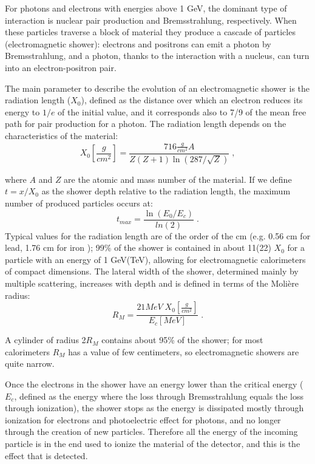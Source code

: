 For photons and electrons with energies above 1 GeV, the dominant type of interaction is nuclear pair production and Bremsstrahlung, respectively. 
When these particles traverse a block of material they produce a cascade of particles (electromagnetic shower): electrons and positrons can emit a photon by Bremsstrahlung, and a photon, thanks to the interaction with a nucleus, can turn into an electron-positron pair.

The main parameter to describe the evolution of an electromagnetic shower is the radiation length ($X_0$), defined as the distance over which an electron reduces its energy to $1/e$ of the initial value, and it corresponds also to 7/9 of the mean free path for pair production for a photon. The radiation length depends on the characteristics of the material:
\begin{equation}
X_0 [\frac{g}{cm^2}] = \frac{716 \frac{g}{ cm^2} A }{Z(Z+1) \ln\left(287/\sqrt{Z}\right)} \; , \nonumber
\end{equation}

\noindent where $A$ and $Z$ are the atomic and mass number of the material. If we define $t = x/X_0$ as the shower depth relative to the radiation length, the maximum number of produced particles occurs at:
\begin{equation}
t_{max} = \frac{\ln\left(E_0/E_c\right)}{ln\left(2\right)} \;. \nonumber
\end{equation}
Typical values for the radiation length are of the order of the cm (e.g. 0.56 cm for lead, 1.76 cm for iron \cite{Patrignani:2016xqp}); 99\% of the shower is contained in about 11(22) $X_0$ for a particle with an energy of 1 GeV(TeV), 
allowing for electromagnetic calorimeters of compact dimensions. 
The lateral width of the shower, determined mainly by multiple scattering, increases with depth and is defined in terms of the Moli\`ere radius:
\begin{equation}
R_M = \frac{21 MeV \; X_0[\frac{g}{cm^2}]}{E_c [MeV]} \; . \nonumber
\end{equation}

\noindent A cylinder of radius 2$R_M$ contains about 95\% of the shower; for most calorimeters $R_M$ has a value of few centimeters, so electromagnetic showers are quite narrow. 

Once the electrons in the shower have an energy lower than the critical energy 
($E_c$, defined as the energy where the loss through Bremsstrahlung equals the loss through ionization), 
the shower stops as the energy is dissipated mostly through ionization for electrons and photoelectric effect for photons, 
and no longer through the creation of new particles. 
Therefore all the energy of the incoming particle is in the end used to ionize the material of the detector, and this is the effect that is detected.


